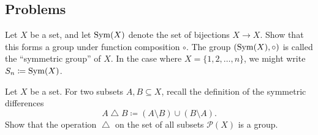 \documentclass[../notes.tex]{subfiles}
\begin{document}


\subsection{Problems}


\begin{homework} \label{prop:sym-groups}
    Let $X$ be a set, and let $\operatorname{Sym}(X)$ denote the set of bijections $X\to X$. Show that this forms a group under function composition $\circ$. The group $(\operatorname{Sym}(X),\circ)$ is called the ``symmetric group'' of $X$. In the case where $X=\{1,2,\ldots,n\}$, we might write $S_n\coloneqq\operatorname{Sym}(X)$.
\end{homework}

\begin{homework}
    Let $X$ be a set. For two subsets $A,B\subseteq X$, recall the definition of the symmetric differences
    \[A\operatorname{\triangle}B\coloneqq(A\setminus B)\cup(B\setminus A).\]
    Show that the operation $\operatorname{\triangle}$ on the set of all subsets $\mathcal P(X)$ is a group.
\end{homework}
\end{document}
